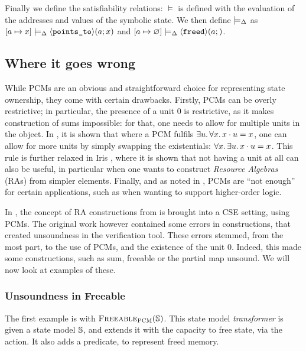 Finally we define the satisfiability relations: $\models$ is defined with the evaluation of the addresses and values of the symbolic state. We then define $\models_{\Delta}$ as ${[a\mapsto x]\models_{\Delta} \left<\texttt{points\_to}\right>\!(a;x)}$ and ${[a\mapsto\varnothing]\models_{\Delta}\left<\texttt{freed}\right>\!(a;)}$.

\subsection{Where it goes wrong}

While PCMs are an obvious and straightforward choice for representing state ownership, they come with certain drawbacks. Firstly, PCMs can be overly restrictive; in particular, the presence of a unit $0$ is restrictive, as it makes construction of sums impossible: for that, one needs to allow for multiple units in the object. In \cite{sepalgebra}, it is shown that where a PCM fulfils $\exists u\ldotp \forall x\ldotp x\cdot u = x$, one can allow for more units by simply swapping the existentials: $\forall x\ldotp \exists u\ldotp x \cdot u = x$. This rule is further relaxed in Iris \cite{iris}, where it is shown that not having a unit at all can also be useful, in particular when one wants to construct \emph{Resource Algebras} (RAs) from simpler elements. Finally, and as noted in \cite{iris}, PCMs are ``not enough'' for certain applications, such as when wanting to support higher-order logic.

In \cite{sacha-phd}, the concept of RA constructions from \cite{iris} is brought into a CSE setting, using PCMs. The original work however contained some errors in constructions, that created unsoundness in the verification tool. These errors stemmed, from the most part, to the use of PCMs, and the existence of the unit $0$. Indeed, this made some constructions, such as sum, freeable or the partial map unsound. We will now look at examples of these.

\subsubsection{Unsoundness in Freeable}

The first example is with $\textsc{Freeable}_{\textsc{PCM}}(\mathbb S)$. This state model \emph{transformer} is given a state model $\mathbb S$, and extends it with the capacity to free state, via the \free{} action. It also adds a \freedP{} predicate, to represent freed memory.

